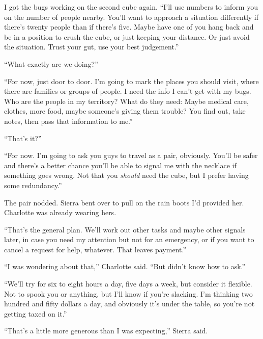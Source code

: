 I got the bugs working on the second cube again.  ``I'll use numbers to inform you on the number of people nearby.  You'll want to approach a situation differently if there's twenty people than if there's five.  Maybe have one of you hang back and be in a position to crush the cube, or just keeping your distance.  Or just avoid the situation.  Trust your gut, use your best judgement.''



``What exactly are we doing?''



``For now, just door to door.  I'm going to mark the places you should visit, where there are families or groups of people.  I need the info I can't get with my bugs.  Who are the people in my territory?  What do they need: Maybe medical care, clothes, more food, maybe someone's giving them trouble?  You find out, take notes, then pass that information to me.''



``That's it?''



``For now.  I'm going to ask you guys to travel as a pair, obviously.  You'll be safer and there's a better chance you'll be able to signal me with the necklace if something goes wrong.  Not that you \emph{should} need the cube, but I prefer having some redundancy.''



The pair nodded.  Sierra bent over to pull on the rain boots I'd provided her.  Charlotte was already wearing hers.



``That's the general plan.  We'll work out other tasks and maybe other signals later, in case you need my attention but not for an emergency, or if you want to cancel a request for help, whatever.  That leaves payment.''



``I was wondering about that,'' Charlotte said.  ``But didn't know how to ask.''



``We'll try for six to eight hours a day, five days a week, but consider it flexible.  Not to spook you or anything, but I'll know if you're slacking.  I'm thinking two hundred and fifty dollars a day, and obviously it's under the table, so you're not getting taxed on it.''



``That's a little more generous than I was expecting,'' Sierra said.




